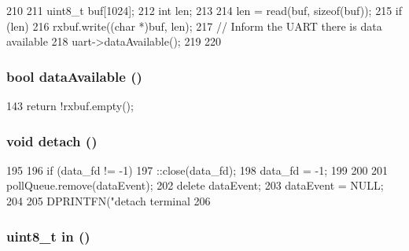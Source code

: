 \begin{DoxyCode}
210 {
211     uint8_t buf[1024];
212     int len;
213 
214     len = read(buf, sizeof(buf));
215     if (len) {
216         rxbuf.write((char *)buf, len);
217         // Inform the UART there is data available
218         uart->dataAvailable();
219     }
220 }
\end{DoxyCode}
\hypertarget{classTerminal_ae2c49c57a81bf30ab522f0eb98a45035}{
\subsubsection[{dataAvailable}]{\setlength{\rightskip}{0pt plus 5cm}bool dataAvailable ()}}
\label{classTerminal_ae2c49c57a81bf30ab522f0eb98a45035}



\begin{DoxyCode}
143 { return !rxbuf.empty(); }
\end{DoxyCode}
\hypertarget{classTerminal_ac295bade8aee589f6718dfa79edc2a34}{
\subsubsection[{detach}]{\setlength{\rightskip}{0pt plus 5cm}void detach ()}}
\label{classTerminal_ac295bade8aee589f6718dfa79edc2a34}



\begin{DoxyCode}
195 {
196     if (data_fd != -1) {
197         ::close(data_fd);
198         data_fd = -1;
199     }
200 
201     pollQueue.remove(dataEvent);
202     delete dataEvent;
203     dataEvent = NULL;
204 
205     DPRINTFN("detach terminal %
206 }
\end{DoxyCode}
\hypertarget{classTerminal_a4200167e7f31117dce374e1885e36b1e}{
\subsubsection[{in}]{\setlength{\rightskip}{0pt plus 5cm}uint8\_\-t in ()}}
\label{classTerminal_a4200167e7f31117dce374e1885e36b1e}



